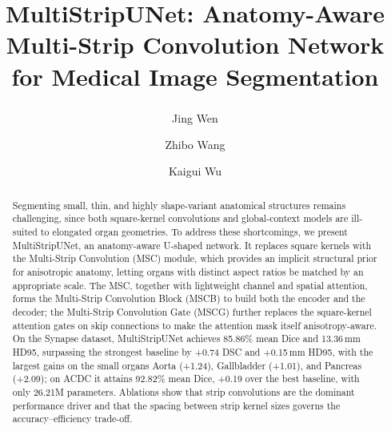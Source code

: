 \documentclass{llncs}
\begin{document}
\title{MultiStripUNet: Anatomy-Aware Multi-Strip Convolution Network for Medical Image Segmentation}

\author{
Jing Wen\textsuperscript{\Letter}\and
Zhibo Wang\and
Kaigui Wu}



\maketitle              %

\begin{abstract}
Segmenting small, thin, and highly shape-variant anatomical structures remains challenging, since both square-kernel convolutions and global-context models are ill-suited to elongated organ geometries. To address these shortcomings, we present MultiStripUNet, an anatomy-aware U-shaped network. It replaces square kernels with the Multi-Strip Convolution (MSC) module, which provides an implicit structural prior for anisotropic anatomy, letting organs with distinct aspect ratios be matched by an appropriate scale. The MSC, together with lightweight channel and spatial attention, forms the Multi-Strip Convolution Block (MSCB) to build both the encoder and the decoder; the Multi-Strip Convolution Gate (MSCG) further replaces the square-kernel attention gates on skip connections to make the attention mask itself anisotropy-aware. On the Synapse dataset, MultiStripUNet achieves 85.86\% mean Dice and 13.36\,mm HD95, surpassing the strongest baseline by +0.74 DSC and +0.15\,mm HD95, with the largest gains on the small organs Aorta (+1.24), Gallbladder (+1.01), and Pancreas (+2.09); on ACDC it attains 92.82\% mean Dice, +0.19 over the best baseline, with only 26.21M parameters. Ablations show that strip convolutions are the dominant performance driver and that the spacing between strip kernel sizes governs the accuracy--efficiency trade-off.

\end{abstract}
\end{document}
